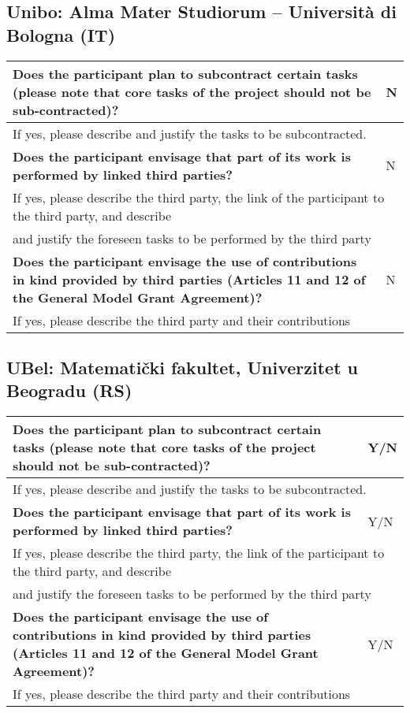 \subsection{Unibo: Alma Mater Studiorum – Università di Bologna (IT)}

\begin{longtable}{|p{}|p{}|}
\hline
{\bf Does the participant plan to subcontract certain tasks (please
  note that core tasks of the project should not be sub-contracted)?}
&
N
\\
\hline
\multicolumn{2}{|l|}{
If yes, please describe and justify the tasks to be subcontracted.}
\\
\hline
{\bf Does the participant envisage that  part of its work is performed
  by linked third parties?}
&
N
\\
\hline
\multicolumn{2}{|l|}{If yes, please describe the third party, the link of the
  participant to the third party, and describe}\\
\multicolumn{2}{|l|}{and justify the foreseen
tasks to be performed by the third party}
\\
\hline
{\bf Does the participant envisage the use of contributions in kind
provided by third parties (Articles 11 and 12 of the General Model
Grant Agreement)?}
&
N
\\
\hline
\multicolumn{2}{|l|}{If yes, please describe the third party and their contributions}
\\
\hline
\end{longtable}

\subsection{UBel: Matematički fakultet, Univerzitet u Beogradu (RS)}

\begin{longtable}{|p{}|p{}|}
\hline
{\bf Does the participant plan to subcontract certain tasks (please
  note that core tasks of the project should not be sub-contracted)?}
&
Y/N
\\
\hline
\multicolumn{2}{|l|}{
If yes, please describe and justify the tasks to be subcontracted.}
\\
\hline
{\bf Does the participant envisage that  part of its work is performed
  by linked third parties?}
&
Y/N
\\
\hline
\multicolumn{2}{|l|}{If yes, please describe the third party, the link of the
  participant to the third party, and describe}\\
\multicolumn{2}{|l|}{and justify the foreseen
tasks to be performed by the third party}
\\
\hline
{\bf Does the participant envisage the use of contributions in kind
provided by third parties (Articles 11 and 12 of the General Model
Grant Agreement)?}
&
Y/N
\\
\hline
\multicolumn{2}{|l|}{If yes, please describe the third party and their contributions}
\\
\hline
\end{longtable}

